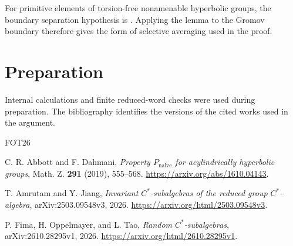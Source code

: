 \documentclass[11pt,letterpaper]{amsart}
\numberwithin{equation}{section}
\theoremstyle{definition}
\theoremstyle{remark}
\begin{document}
For primitive elements of torsion-free nonamenable hyperbolic groups,
the boundary separation hypothesis is
\cite[Lemma~4.1]{AJ}. Applying the lemma to the Gromov boundary
therefore gives the form of selective averaging used in the proof.

\section*{Preparation}

Internal calculations and finite reduced-word checks were used during
preparation. The bibliography identifies the versions of the cited works
used in the argument.

\begin{thebibliography}{FOT26}

C. R. Abbott and F. Dahmani,
\emph{Property $P_{\mathrm{naive}}$ for acylindrically hyperbolic groups},
Math. Z. \textbf{291} (2019), 555--568.
\url{https://arxiv.org/abs/1610.04143}.

T. Amrutam and Y. Jiang,
\emph{Invariant $C^*$-subalgebras of the reduced group $C^*$-algebra},
arXiv:2503.09548v3, 2026.
\url{https://arxiv.org/html/2503.09548v3}.

P. Fima, H. Oppelmayer, and L. Tao,
\emph{Random $C^*$-subalgebras}, arXiv:2610.28295v1, 2026.
\url{https://arxiv.org/html/2610.28295v1}.

\end{thebibliography}
\end{document}
